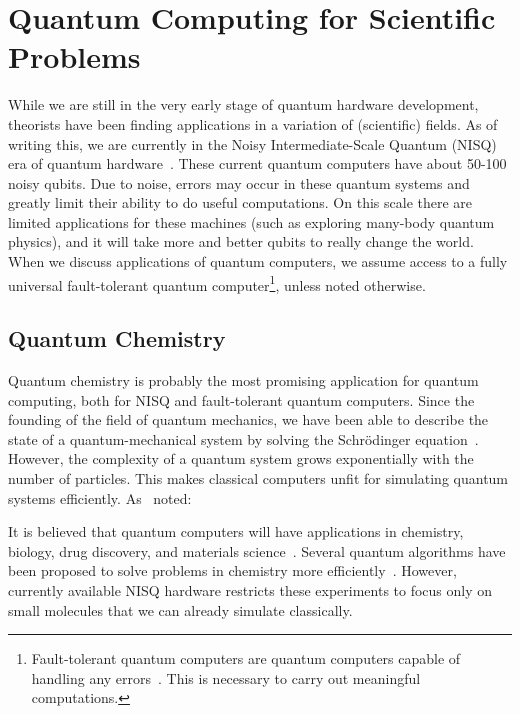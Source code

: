 \documentclass[twocolumn, switch]{article}
\begin{document}
    \section{Quantum Computing for Scientific Problems} \label{sec:quantum-science}
    While we are still in the very early stage of quantum hardware development, theorists have been finding applications in a variation of (scientific) fields.
    As of writing this, we are currently in the Noisy Intermediate-Scale Quantum (NISQ) era of quantum hardware~\cite{preskill2018quantum}.
    These current quantum computers have about 50-100 noisy qubits.
    Due to noise, errors may occur in these quantum systems and greatly limit their ability to do useful computations.
    On this scale there are limited applications for these machines (such as exploring many-body quantum physics), and it will take more and better qubits to really change the world.
    When we discuss applications of quantum computers, we assume access to a fully universal fault-tolerant quantum computer\footnote{Fault-tolerant quantum computers are quantum computers capable of handling any errors~\cite{oud2019introduction}. This is necessary to carry out meaningful computations.}, unless noted otherwise.
    
    \subsection{Quantum Chemistry}
    Quantum chemistry is probably the most promising application for quantum computing, both for NISQ and fault-tolerant quantum computers.
    Since the founding of the field of quantum mechanics, we have been able to describe the state of a quantum-mechanical system by solving the Schr{\"o}dinger equation~\cite{griffiths2018introduction}.
    However, the complexity of a quantum system grows exponentially with the number of particles.
    This makes classical computers unfit for simulating quantum systems efficiently.
    As~\textcite{dirac1929quantum} noted: 

    It is believed that quantum computers will have applications in chemistry, biology, drug discovery, and materials science~\cite{mcardle2018quantum}.
    Several quantum algorithms have been proposed to solve problems in chemistry more efficiently~\cite{lidar1999calculating, kassal2008polynomial, aspuru2005simulated, vqe}.
    However, currently available NISQ hardware restricts these experiments to focus only on small molecules that we can already simulate classically.
    
\end{document}
